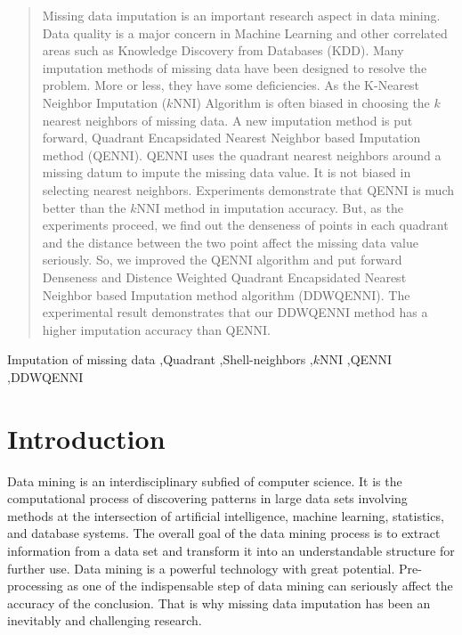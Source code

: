\documentclass[print]{jicspack}
\begin{document}
\begin{premaker}
\begin{abstract}
Missing data imputation is an important research aspect in data mining. Data quality is a major concern in Machine Learning and other correlated areas such as Knowledge Discovery from Databases (KDD). Many imputation methods of missing data have been designed to resolve the problem. More or less, they have some deficiencies. As the K-Nearest Neighbor Imputation ($k$NNI) Algorithm is often biased in choosing the $k$ nearest neighbors of missing data. A new imputation method is put forward, Quadrant Encapsidated Nearest Neighbor based Imputation method (QENNI). QENNI uses the quadrant nearest neighbors around a missing datum to impute the missing data value. It is not biased in selecting nearest neighbors. Experiments demonstrate that QENNI is much better than the $k$NNI method in imputation accuracy. But, as the experiments proceed, we find out the denseness of points in each quadrant and the distance between the two point affect the missing data value seriously. So, we improved the QENNI algorithm and put forward Denseness and Distence Weighted Quadrant Encapsidated Nearest Neighbor based Imputation method algorithm (DDWQENNI). The experimental result demonstrates that our DDWQENNI method has a higher imputation accuracy than QENNI.
\end{abstract}
\begin{keyword}
Imputation of missing data \sep Quadrant \sep Shell-neighbors  \sep $k$NNI \sep QENNI \sep DDWQENNI
\end{keyword}
\end{premaker}

\section{Introduction}
\label{Maintext}
Data mining is an interdisciplinary subfied of computer science. It is the computational process of discovering patterns in large data sets involving methods at the intersection of artificial intelligence, machine learning, statistics, and database systems. The overall goal of the data mining process is to extract information from a data set and transform it into an understandable structure for further use. Data mining is a powerful technology with great potential. Pre-processing as one of the indispensable step of data mining can seriously affect the accuracy of the conclusion. That is why missing data imputation has been an inevitably and challenging research.
\end{document}
